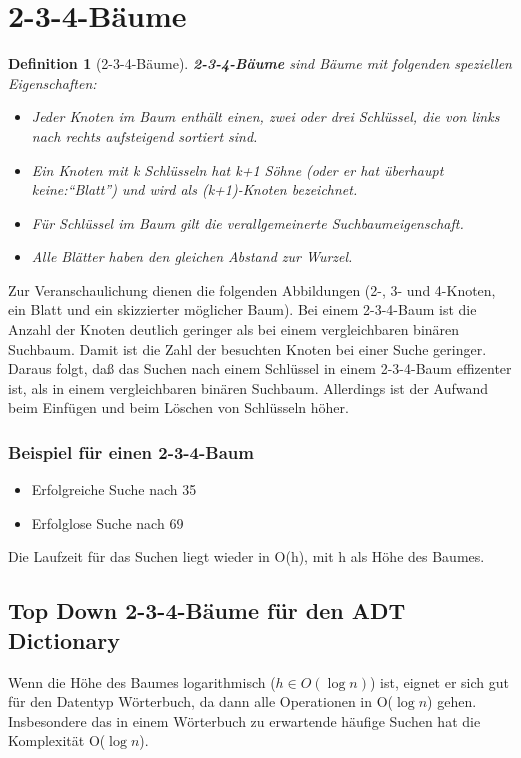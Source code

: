 \documentclass[ngerman,draft,parskip=half*,twoside]{scrreprt}
\theoremstyle{break}
\newtheorem{definition}{Definition}
\begin{document}
\section{2-3-4-Bäume}
\begin{definition}[2-3-4-Bäume]
\textbf{2-3-4-Bäume} sind Bäume mit folgenden speziellen Eigenschaften:
\begin{itemize}
				\item Jeder Knoten im Baum enthält einen, zwei oder drei Schlüssel, 
							die von links nach rechts aufsteigend sortiert sind.		
				\item Ein Knoten mit k Schlüsseln hat k+1 Söhne (oder er hat überhaupt keine:``Blatt'') und wird als
							 (k+1)-Knoten bezeichnet.
				\item Für Schlüssel im Baum gilt die verallgemeinerte Suchbaumeigenschaft.
				\item Alle Blätter haben den gleichen Abstand zur Wurzel.	
			\end{itemize}
\end{definition}
Zur Veranschaulichung dienen die folgenden Abbildungen (2-, 3- und 4-Knoten, ein Blatt und ein skizzierter möglicher Baum).
			 	\centering		
				\centering
	 			\centering
		Bei einem 2-3-4-Baum ist die Anzahl der Knoten deutlich geringer als bei
		einem vergleichbaren binären Suchbaum. Damit ist die Zahl der besuchten 
		Knoten bei einer Suche geringer. Daraus folgt, daß das Suchen nach einem
		Schlüssel in einem 2-3-4-Baum effizenter ist, als in einem vergleichbaren binären Suchbaum.
		Allerdings ist der Aufwand beim Einfügen und beim Löschen von Schlüsseln höher.
\subsubsection{Beispiel für einen 2-3-4-Baum}
		\centering
		\begin{itemize}
			\item Erfolgreiche Suche nach 35
			\item Erfolglose Suche nach 69
		\end{itemize}
		Die Laufzeit für das Suchen liegt wieder in O(h), mit h als Höhe des Baumes.
\subsection{Top Down 2-3-4-Bäume für den ADT Dictionary}

Wenn die Höhe des Baumes logarithmisch ($h \in O(\log n)$) ist, eignet er sich gut für den Datentyp
Wörterbuch, da dann alle Operationen in O($\log n$) gehen. Insbesondere das in einem Wörterbuch zu erwartende häufige Suchen hat
die Komplexität O($\log n$).	
\end{document}
